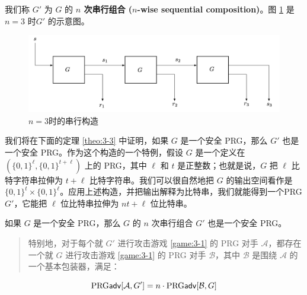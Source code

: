 \vspace*{5pt}

\noindent
我们称 $G'$ 为 $G$ 的 \textbf{$n$ 次串行组合 ($n$-wise sequential composition)}。图 \ref{fig:3-6} 是 $n=3$ 时$G'$ 的示意图。

\begin{figure}
  \centering
  \includegraphics[width=0.8\linewidth]{figures/chapter3/fig6.png}
  \caption{$n=3$时的串行构造}
  \label{fig:3-6}
\end{figure}

我们将在下面的定理 \ref{theo:3-3} 中证明，如果 $G$ 是一个安全 PRG，那么 $G'$ 也是一个安全 PRG。作为这个构造的一个特例，假设 $G$ 是一个定义在 $(\{0,1\}^\ell,\{0,1\}^{t+\ell})$ 上的 PRG，其中 $\ell$ 和 $t$ 是正整数；也就是说，$G$ 把 $\ell$ 比特字符串拉伸为 $t+\ell$ 比特字符串。我们可以很自然地把 $G$ 的输出空间看作是 $\{0,1\}^t\times\{0,1\}^\ell$。应用上述构造，并把输出解释为比特串，我们就能得到一个PRG $G'$，它能把 $\ell$ 位比特串拉伸为 $nt+\ell$ 位比特串。

\begin{theorem}\label{theo:3-3}
如果 $G$ 是一个安全 PRG，那么 $G$ 的 $n$ 次串行组合 $G'$ 也是一个安全 PRG。
\begin{quote}
特别地，对于每个就 $G'$ 进行攻击游戏 \ref{game:3-1} 的 PRG 对手 $\mathcal A$，都存在一个就 $G$ 进行攻击游戏 \ref{game:3-1} 的 PRG 对手 $\mathcal B$，其中 $\mathcal B$ 是围绕 $\mathcal A$ 的一个基本包装器，满足：
\end{quote}
$$
{\rm PRG\mathsf{adv}}[\mathcal{A},G']=n\cdot{\rm PRG\mathsf{adv}}[\mathcal{B},G]
$$
\end{theorem}

